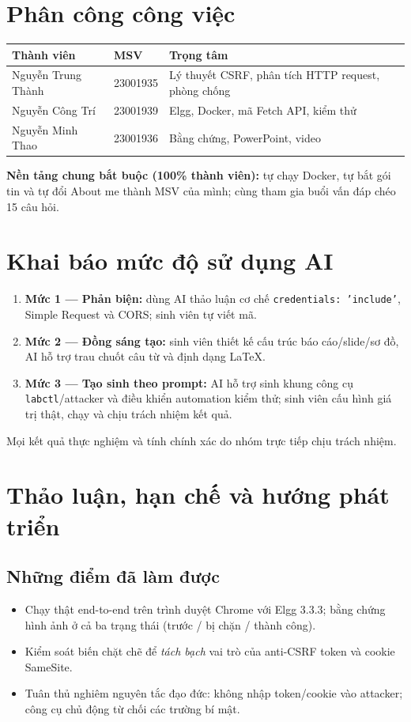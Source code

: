 \documentclass[11pt,a4paper]{article}
\begin{document}
\section{Phân công công việc}
\begin{center}\small
\begin{tabularx}{\linewidth}{@{}l l Y@{}}
\toprule
\textbf{Thành viên} & \textbf{MSV} & \textbf{Trọng tâm}\\
\midrule
Nguyễn Trung Thành & 23001935 & Lý thuyết CSRF, phân tích HTTP request, phòng chống\\
Nguyễn Công Trí & 23001939 & Elgg, Docker, mã Fetch API, kiểm thử\\
Nguyễn Minh Thao & 23001936 & Bằng chứng, PowerPoint, video\\
\bottomrule
\end{tabularx}
\end{center}
\noindent \textbf{Nền tảng chung bắt buộc (100\% thành viên):} tự chạy Docker, tự bắt gói tin và tự đổi About me thành MSV của mình; cùng tham gia buổi vấn đáp chéo 15 câu hỏi.

\section{Khai báo mức độ sử dụng AI}
\begin{enumerate}
  \item \textbf{Mức 1 — Phản biện:} dùng AI thảo luận cơ chế \texttt{credentials: 'include'}, Simple Request và CORS; sinh viên tự viết mã.
  \item \textbf{Mức 2 — Đồng sáng tạo:} sinh viên thiết kế cấu trúc báo cáo/slide/sơ đồ, AI hỗ trợ trau chuốt câu từ và định dạng LaTeX.
  \item \textbf{Mức 3 — Tạo sinh theo prompt:} AI hỗ trợ sinh khung công cụ \texttt{labctl}/attacker và điều khiển automation kiểm thử; sinh viên cấu hình giá trị thật, chạy và chịu trách nhiệm kết quả.
\end{enumerate}
\noindent Mọi kết quả thực nghiệm và tính chính xác do nhóm trực tiếp chịu trách nhiệm.

\section{Thảo luận, hạn chế và hướng phát triển}
\subsection{Những điểm đã làm được}
\begin{itemize}
  \item Chạy thật end-to-end trên trình duyệt Chrome với Elgg 3.3.3; bằng chứng hình ảnh ở cả ba trạng thái (trước / bị chặn / thành công).
  \item Kiểm soát biến chặt chẽ để \emph{tách bạch} vai trò của anti-CSRF token và cookie SameSite.
  \item Tuân thủ nghiêm nguyên tắc đạo đức: không nhập token/cookie vào attacker; công cụ chủ động từ chối các trường bí mật.
\end{itemize}
\end{document}
